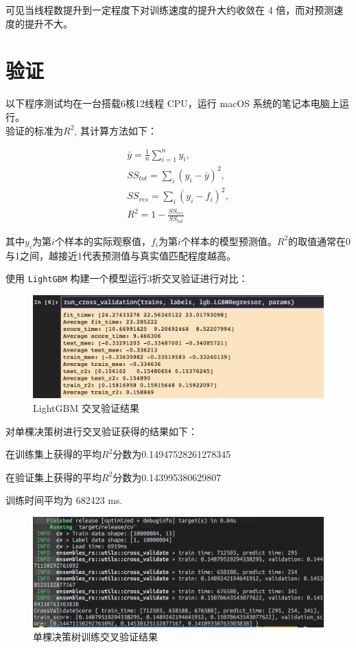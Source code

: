 \documentclass[12pt]{article}
\begin{document}
可见当线程数提升到一定程度下对训练速度的提升大约收敛在 4 倍，而对预测速度的提升不大。

\section{验证}
以下程序测试均在一台搭载6核12线程 CPU，运行 macOS 系统的笔记本电脑上运行。
\\

验证的标准为$R^2$, 其计算方法如下：

\begin{equation}
    \begin{aligned}
    \bar{y}= \frac{1}{n}\sum_{i=1}^n y_i,\\
    SS_{tot} = \sum_i(y_i-\overline{y})^2,\\
    SS_{res} = \sum_i(y_i-f_i)^2,\\
    R^2 = 1 - \frac{SS_{res}}{SS_{tot}}
    \end{aligned}
\end{equation}

其中$y_i$为第$i$个样本的实际观察值，$f_i$为第$i$个样本的模型预测值。$R^2$的取值通常在0与1之间，越接近1代表预测值与真实值匹配程度越高。


使用 \lstinline{LightGBM}  构建一个模型运行3折交叉验证进行对比：

\begin{figure}[H]
    \centering
    \includegraphics[scale=0.6]{lgb-baseline.png}
    \caption{LightGBM 交叉验证结果}
    \label{}
\end{figure}

对单棵决策树进行交叉验证获得的结果如下：

在训练集上获得的平均$R^2$分数为0.14947528261278345

在验证集上获得的平均$R^2$分数为0.143995380629807

训练时间平均为 682423 ms.

\begin{figure}[H]
    \centering
    \includegraphics[scale=0.6]{single-tree-cv.png}
    \caption{单棵决策树训练交叉验证结果}
    \label{}
\end{figure}
\end{document}
